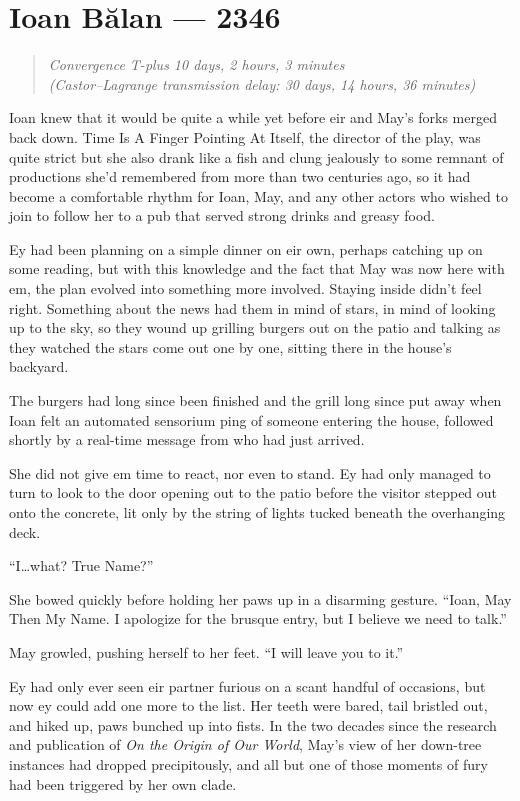 \hypertarget{ioan-bux103lan-2346}{%
\chapter{Ioan Bălan — 2346}}

\begin{quote}
\emph{Convergence T-plus 10 days, 2 hours, 3 minutes}\\
\emph{(Castor--Lagrange transmission delay: 30 days, 14 hours, 36 minutes)}
\end{quote}

\noindent Ioan knew that it would be quite a while yet before eir and May's forks merged back down. Time Is A Finger Pointing At Itself, the director of the play, was quite strict but she also drank like a fish and clung jealously to some remnant of productions she'd remembered from more than two centuries ago, so it had become a comfortable rhythm for Ioan, May, and any other actors who wished to join to follow her to a pub that served strong drinks and greasy food.

Ey had been planning on a simple dinner on eir own, perhaps catching up on some reading, but with this knowledge and the fact that May was now here with em, the plan evolved into something more involved. Staying inside didn't feel right. Something about the news had them in mind of stars, in mind of looking up to the sky, so they wound up grilling burgers out on the patio and talking as they watched the stars come out one by one, sitting there in the house's backyard.

The burgers had long since been finished and the grill long since put away when Ioan felt an automated sensorium ping of someone entering the house, followed shortly by a real-time message from who had just arrived.

She did not give em time to react, nor even to stand. Ey had only managed to turn to look to the door opening out to the patio before the visitor stepped out onto the concrete, lit only by the string of lights tucked beneath the overhanging deck.

``I\ldots what? True Name?''

She bowed quickly before holding her paws up in a disarming gesture. ``Ioan, May Then My Name. I apologize for the brusque entry, but I believe we need to talk.''

May growled, pushing herself to her feet. ``I will leave you to it.''

Ey had only ever seen eir partner furious on a scant handful of occasions, but now ey could add one more to the list. Her teeth were bared, tail bristled out, and hiked up, paws bunched up into fists. In the two decades since the research and publication of \emph{On the Origin of Our World}, May's view of her down-tree instances had dropped precipitously, and all but one of those moments of fury had been triggered by her own clade.

